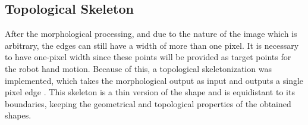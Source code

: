 \documentclass[conference]{IEEEtran}
\begin{document}

\subsection{Topological Skeleton}

After the morphological processing, and due to the nature of the image which is arbitrary, the edges can still have a width of more than one pixel. It is necessary to have one-pixel width since these points will be provided as target points for the robot hand motion. Because of this, a topological skeletonization was implemented, which takes the morphological output as input and outputs a single pixel edge \cite{maragos1986morphological}. This skeleton is a thin version of the shape and is equidistant to its boundaries, keeping the geometrical and topological properties of the obtained shapes.
\end{document}

